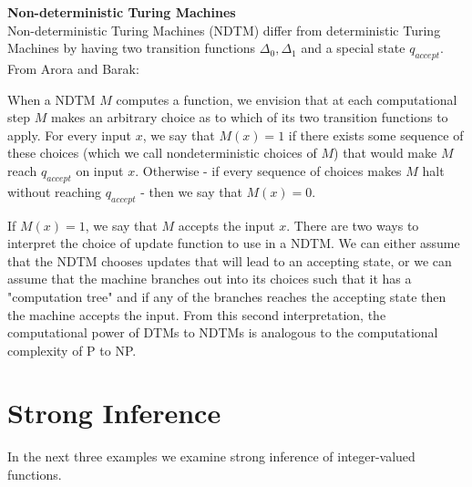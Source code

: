 \documentclass[11pt]{article}
\begin{document}
\textbf{Non-deterministic Turing Machines} \\
Non-deterministic Turing Machines (NDTM) differ from deterministic Turing Machines by having two transition functions $ \Delta_0, \Delta_1 $ and a special state $ q_{accept} $. From Arora and Barak:

\begin{displayquote}
When a NDTM $M$ computes a function, we envision that at each computational step $ M $ makes an arbitrary choice as to which of its two transition functions to apply. For every input $ x $, we say that $ M(x) = 1 $ if there exists some sequence of these choices (which we call nondeterministic choices of $ M $) that would make $ M $ reach $ q_{accept} $ on input $ x $. Otherwise - if every sequence of choices makes $ M $ halt without reaching $ q_{accept} $ - then we say that $ M(x) = 0 $. 
\end{displayquote}

If $ M(x) = 1$, we say that $ M $ accepts the input $ x $. There are two ways to interpret the choice of update function to use in a NDTM. We can either assume that the NDTM chooses updates that will lead to an accepting state, or we can assume that the machine branches out into its choices such that it has a "computation tree" and if any of the branches reaches the accepting state then the machine accepts the input. From this second interpretation, the computational power of DTMs to NDTMs is analogous to the computational complexity of P to NP. \\

\section{Strong Inference} 
 
In the next three examples we examine strong inference of integer-valued functions. \\
 
\end{document}
